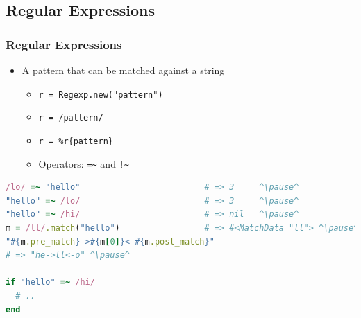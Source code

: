 \subsection{Regular Expressions}
\begin{frame}[fragile]\frametitle{Regular Expressions}

\begin{itemize}

\item A pattern that can be matched against a string

\begin{itemize}
\item \texttt{r = Regexp.new("pattern")}
\pause
\item \texttt{r = /pattern/}
\pause
\item \texttt{r = \%r\{pattern\}}
\pause
\item Operators: \texttt{=\~} and \texttt{!\~}
\end{itemize}

\end{itemize}

\pause

\begin{lstlisting}[language=ruby, escapechar={^}]
/lo/ =~ "hello"                         # => 3     ^\pause^
"hello" =~ /lo/                         # => 3     ^\pause^
"hello" =~ /hi/                         # => nil   ^\pause^
m = /ll/.match("hello")                 # => #<MatchData "ll"> ^\pause^
"#{m.pre_match}->#{m[0]}<-#{m.post_match}" 
# => "he->ll<-o" ^\pause^

if "hello" =~ /hi/
  # ..
end
\end{lstlisting}

\end{frame}




